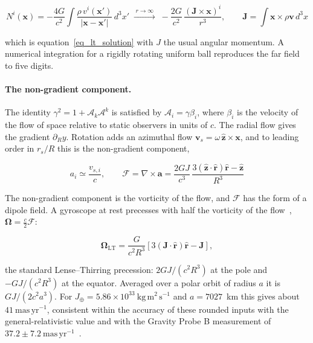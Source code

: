 \documentclass[pdflatex,sn-mathphys-num]{sn-jnl}%
\theoremstyle{thmstyleone}%
\theoremstyle{thmstyletwo}%
\theoremstyle{thmstylethree}%
\begin{document}
\begin{equation}
    N^i(\mathbf{x})=-\frac{4G}{c^2}\int\frac{\rho\,v^i(\mathbf{x}')}{|\mathbf{x}-\mathbf{x}'|}\,d^3x'
    \;\xrightarrow{\;r\to\infty\;}\;
    -\frac{2G}{c^2}\,\frac{(\mathbf{J}\times\mathbf{x})^i}{r^3},
    \qquad
    \mathbf{J}=\int\mathbf{x}\times\rho\mathbf{v}\,d^3x
\end{equation}

which is equation~\eqref{eq_lt_solution} with $J$ the usual angular momentum. A numerical integration for a rigidly rotating uniform ball reproduces the far field to five digits.

\paragraph{The non-gradient component.} The identity $\gamma^2=1+\mathcal{A}_k\mathcal{A}^k$ is satisfied by $\mathcal{A}_i=\gamma\beta_i$, where $\beta_i$ is the velocity of the flow of space relative to static observers in units of $c$. The radial flow gives the gradient $\partial_R y$. Rotation adds an azimuthal flow $\mathbf{v}_s=\omega\,\hat{\mathbf{z}}\times\mathbf{x}$, and to leading order in $r_s/R$ this is the non-gradient component,

\begin{equation}\label{eq_nongradient_flow}
    a_i\simeq\frac{v_{s,i}}{c},
    \qquad
    \mathcal{F}=\nabla\times\mathbf{a}=\frac{2GJ}{c^3}\,\frac{3(\hat{\mathbf{z}}\cdot\hat{\mathbf{r}})\hat{\mathbf{r}}-\hat{\mathbf{z}}}{R^3}
\end{equation}

The non-gradient component is the vorticity of the flow, and $\mathcal{F}$ has the form of a dipole field. A gyroscope at rest precesses with half the vorticity of the flow~\cite{HamiltonLisle2008}, $\boldsymbol{\Omega}=\tfrac{c}{2}\mathcal{F}$:

\begin{equation}\label{eq_gyro}
    \boldsymbol{\Omega}_{\mathrm{LT}}=\frac{G}{c^2R^3}\left[3(\mathbf{J}\cdot\hat{\mathbf{r}})\hat{\mathbf{r}}-\mathbf{J}\right],
\end{equation}

the standard Lense--Thirring precession: $2GJ/(c^2R^3)$ at the pole and $-GJ/(c^2R^3)$ at the equator. Averaged over a polar orbit of radius $a$ it is $GJ/(2c^2a^3)$. For $J_\oplus=5.86\times10^{33}~\mathrm{kg\,m^2\,s^{-1}}$ and $a=7027$~km this gives about $41~\mathrm{mas\,yr^{-1}}$, consistent within the accuracy of these rounded inputs with the general-relativistic value and with the Gravity Probe B measurement of $37.2\pm7.2~\mathrm{mas\,yr^{-1}}$~\cite{Everitt2011GPB}.
\end{document}
